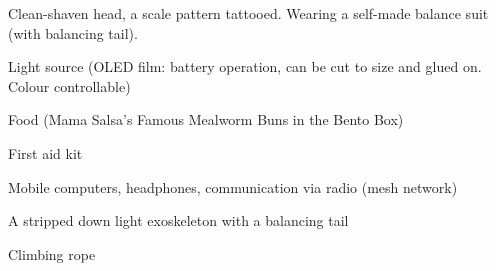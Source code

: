 \newpage
\begin{npcBox}[title=Curly continued]
    \begin{npcDescription}
    Clean-shaven head, a scale pattern tattooed. Wearing a self-made balance suit (with balancing tail).        
    \end{npcDescription}


    \begin{equipment}
    \item Light source (OLED film: battery operation, can be cut to size and glued on. Colour controllable)
    \item Food (Mama Salsa's Famous Mealworm Buns in the Bento Box)
    \item First aid kit
    \item Mobile computers, headphones, communication via radio (mesh network)
    \item A stripped down light exoskeleton with a balancing tail
    \item Climbing rope
    \end{equipment}
\end{npcBox}




